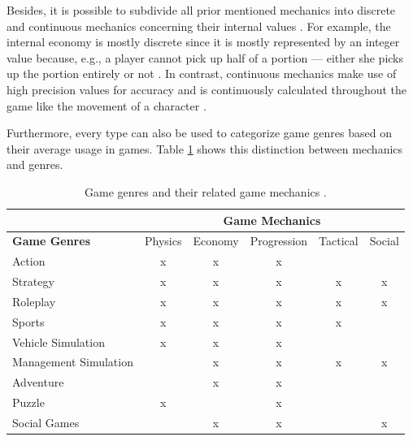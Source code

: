 \documentclass[MGS,Master,english]{twbook}%
\begin{document}
Besides, it is possible to subdivide all prior mentioned mechanics into discrete and continuous mechanics concerning their internal values \cite{gameDesign::gameMechanicsAdvancedGameDesign}. For example, the internal economy is mostly discrete since it is mostly represented by an integer value because, e.g., a player cannot pick up half of a portion — either she picks up the portion entirely or not \cite{gameDesign::gameMechanicsAdvancedGameDesign}. In contrast, continuous mechanics make use of high precision values for accuracy and is continuously calculated throughout the game like the movement of a character \cite{gameDesign::gameMechanicsAdvancedGameDesign}. 

Furthermore, every type can also be used to categorize game genres based on their average usage in games. Table \ref{GameMechanicsToGenre} shows this distinction between mechanics and genres.
\begin{table}[!ht]
	\centering
	{%
		\begin{tabular}{l||c|c|c|c|c|}
			\cline{2-6}
			& \multicolumn{5}{c|}{\textbf{Game Mechanics}}        \\ \hline 
			\multicolumn{1}{|l||}{\textbf{Game Genres}}  & Physics & Economy & Progression & Tactical & Social \\ \hline \hline
			\multicolumn{1}{|l||}{Action}                & x       & x       & x           &          &        \\ \hline
			\multicolumn{1}{|l||}{Strategy}              & x       & x       & x           & x        & x      \\ \hline
			\multicolumn{1}{|l||}{Roleplay}              & x       & x       & x           & x        & x      \\ \hline
			\multicolumn{1}{|l||}{Sports}                & x       & x       & x           & x        &        \\ \hline
			\multicolumn{1}{|l||}{Vehicle Simulation}    & x       & x       & x           &          &        \\ \hline
			\multicolumn{1}{|l||}{Management Simulation} &         & x       & x           & x        & x      \\ \hline
			\multicolumn{1}{|l||}{Adventure}             &         & x       & x           &          &        \\ \hline
			\multicolumn{1}{|l||}{Puzzle}                & x       &         & x           &          &        \\ \hline
			\multicolumn{1}{|l||}{Social Games}          &         & x       & x           &          & x      \\ \hline
		\end{tabular}%
	}
	\caption{Game genres and their related game mechanics \protect\cite{gameDesign::gameMechanicsAdvancedGameDesign}.}
	\label{GameMechanicsToGenre}
\end{table}
\end{document}
